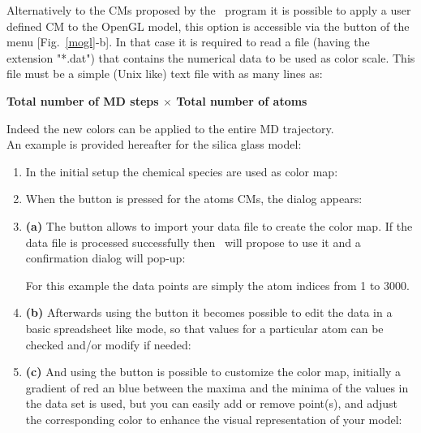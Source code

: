 Alternatively to the CMs proposed by the \atomes\ program it is possible to apply a user defined CM to the OpenGL model, 
this option is accessible via the  button of the  menu [Fig.~\ref{mogl}-b]. 
In that case it is required to read a file (having the extension "*.dat") that contains the numerical data to be used as color scale. 
This file must be a simple (Unix like) text file with as many lines as: 
\begin{center}{\bf{Total number of MD steps $\times$ Total number of atoms}}\end{center} 
Indeed the new colors can be applied to the entire MD trajectory. \\
An example is provided hereafter for the silica glass model: \\
\begin{enumerate}
\item In the initial setup the chemical species are used as color map:
\begin{center}\end{center}
\item When the  button is pressed for the atoms CMs, the  dialog appears: 
\begin{center}\end{center}
\item {\bf{(a)}} The  button allows to import your data file to create the color map. 
If the data file is processed successfully then \atomes\ will propose to use it and a confirmation dialog will pop-up: 
\begin{center}\end{center}
For this example the data points are simply the atom indices from 1 to 3000. 
\item {\bf{(b)}} Afterwards using the  button it becomes possible to edit the data in a basic spreadsheet like mode, 
so that values for a particular atom can be checked and/or modify if needed:
\begin{center}\end{center}
\item {\bf{(c)}} And using the  button is possible to customize the color map, 
initially a gradient of red an blue between the maxima and the minima of the values in the data set is used, 
but you can easily add or remove point(s), and adjust the corresponding color to enhance the visual representation of your model: 

\end{enumerate}

